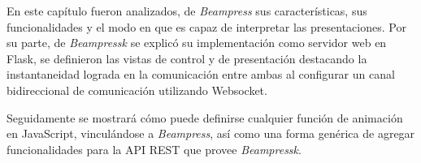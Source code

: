 			

	En este capítulo fueron analizados, de \textit{Beampress} sus características, sus funcionalidades y el modo en que es capaz de interpretar las presentaciones. Por su parte, de \textit{Beampressk} se explicó su implementación como servidor web en Flask, se definieron las vistas de control y de presentación destacando la instantaneidad lograda en la comunicación entre ambas al configurar un canal bidireccional de comunicación utilizando Websocket.

	Seguidamente se mostrará cómo puede definirse cualquier función de animación en JavaScript, vinculándose a \textit{Beampress}, así como una forma genérica de agregar funcionalidades para la API REST que provee \textit{Beampressk}.
		
